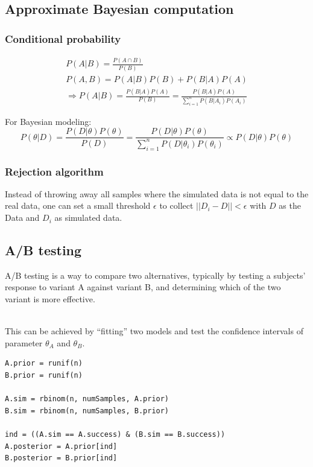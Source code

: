 \subsection{Approximate Bayesian computation}
\subsubsection{Conditional probability}
\begin{gather*}
P(A|B) = \frac{P(A\cap B)}{P(B)}\\
P(A,B) = P(A|B)P(B) + P(B|A)P(A)\\
\Rightarrow P(A|B) = \frac{P(B|A)P(A)}{P(B)} = \frac{P(B|A)P(A)}{\sum_{i=1}^{n}P(B|A_i)P(A_i)}
\end{gather*}

For Bayesian modeling:
\begin{equation*}
P(\theta|D) = \frac{P(D|\theta)P(\theta)}{P(D)} = \frac{P(D|\theta)P(\theta)}{\sum_{i=1}^{n}P(D|\theta_i)P(\theta_i)} \propto P(D|\theta)P(\theta)
\end{equation*}

\subsubsection{Rejection algorithm}
Instead of throwing away all samples where the simulated data is not equal to the real data, one can set a small threshold $\epsilon$ to collect $||D_i-D||<\epsilon$ with $D$ as the Data and $D_i$ as simulated data. 

\subsection{A/B testing}
A/B testing is a way to compare two alternatives, typically by testing a subjects' response to variant A against variant B, and determining which of the two variant is more effective.

\mbox{}\\
This can be achieved by ``fitting'' two models and test the confidence intervals of parameter $\theta_A$ and $\theta_B$.

\begin{lstlisting}
A.prior = runif(n)
B.prior = runif(n)

A.sim = rbinom(n, numSamples, A.prior)
B.sim = rbinom(n, numSamples, B.prior)

ind = ((A.sim == A.success) & (B.sim == B.success))
A.posterior = A.prior[ind]
B.posterior = B.prior[ind]
\end{lstlisting}

